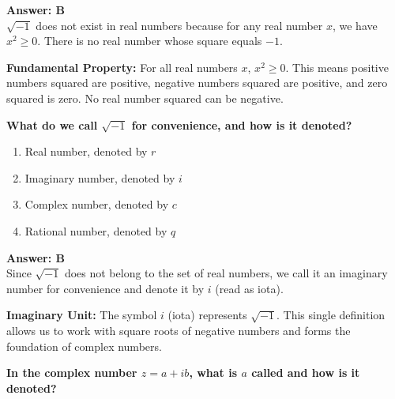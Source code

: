 \documentclass[12pt,a4paper]{article}
\begin{document}
\begin{answerstyle}
\textbf{Answer: B} \\
\( \sqrt{-1} \) does not exist in real numbers because for any real number \( x \), we have \( x^2 \geq 0 \). There is no real number whose square equals \( -1 \).
\end{answerstyle}

\begin{conceptbox}
\textbf{Fundamental Property:} For all real numbers \( x \), \( x^2 \geq 0 \). This means positive numbers squared are positive, negative numbers squared are positive, and zero squared is zero. No real number squared can be negative.
\end{conceptbox}

\newpage
\begin{questiontitle}[MCQ 20]
\textbf{What do we call \( \sqrt{-1} \) for convenience, and how is it denoted?}
\end{questiontitle}

\begin{partbox}[Options]
\begin{enumerate}[label=\Alph*.]
    \item Real number, denoted by \( r \)
    \item Imaginary number, denoted by \( i \)
    \item Complex number, denoted by \( c \)
    \item Rational number, denoted by \( q \)
\end{enumerate}
\end{partbox}

\begin{answerstyle}
\textbf{Answer: B} \\
Since \( \sqrt{-1} \) does not belong to the set of real numbers, we call it an imaginary number for convenience and denote it by \( i \) (read as iota).
\end{answerstyle}

\begin{conceptbox}
\textbf{Imaginary Unit:} The symbol \( i \) (iota) represents \( \sqrt{-1} \). This single definition allows us to work with square roots of negative numbers and forms the foundation of complex numbers.
\end{conceptbox}

\newpage
\begin{questiontitle}[MCQ 21]
\textbf{In the complex number \( z = a + ib \), what is \( a \) called and how is it denoted?}
\end{questiontitle}
\end{document}
